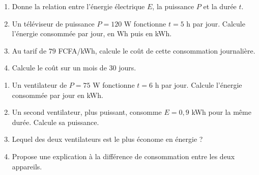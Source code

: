 \begin{enumerate}[label=\arabic*)]
\item Donne la relation entre l'énergie électrique $E$, la puissance $P$ et la durée $t$.
\item Un téléviseur de puissance $P=120$ W fonctionne $t=5$ h par jour. Calcule l'énergie
consommée par jour, en Wh puis en kWh.
\item Au tarif de $79$ FCFA/kWh, calcule le coût de cette consommation journalière.
\item Calcule le coût sur un mois de $30$ jours.
\end{enumerate}

\begin{enumerate}[label=\arabic*)]
\item Un ventilateur de $P=75$ W fonctionne $t=6$ h par jour. Calcule l'énergie consommée
par jour en kWh.
\item Un second ventilateur, plus puissant, consomme $E=0{,}9$ kWh pour la même durée.
Calcule sa puissance.
\item Lequel des deux ventilateurs est le plus économe en énergie ?
\item Propose une explication à la différence de consommation entre les deux appareils.
\end{enumerate}

